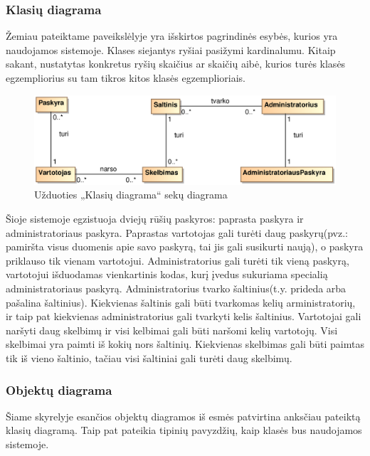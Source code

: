 \documentclass[12pt]{article}
\begin{document}
	\subsubsection{Klasių diagrama}
	
	Žemiau pateiktame paveikslėlyje yra išskirtos pagrindinės esybės, kurios yra naudojamos sistemoje. Klases siejantys ryšiai pasižymi kardinalumu. Kitaip sakant, nustatytas konkretus ryšių skaičius ar skaičių aibė, kurios turės klasės egzempliorius su tam tikros kitos klasės egzemplioriais.
	
	\begin{figure}[h]
		\begin{center}
			\includegraphics[width=\textwidth]{KlasiuDiagrama.eps}
			\caption{Užduoties „Klasių diagrama“ sekų diagrama\label{ClassDiagram}}
		\end{center}
	\end{figure}
	
	Šioje sistemoje egzistuoja dviejų rūšių paskyros: paprasta paskyra ir administratoriaus paskyra. Paprastas vartotojas gali turėti daug paskyrų(pvz.: pamiršta visus duomenis apie savo paskyrą, tai jis gali susikurti naują), o paskyra priklauso tik vienam vartotojui. Administratorius gali turėti tik vieną paskyrą, vartotojui išduodamas vienkartinis kodas, kurį įvedus sukuriama specialią administratoriaus paskyrą. Administratorius tvarko šaltinius(t.y. prideda arba pašalina šaltinius). Kiekvienas šaltinis gali būti tvarkomas kelių arministratorių, ir taip pat kiekvienas administratorius gali tvarkyti kelis šaltinius. Vartotojai gali naršyti daug skelbimų ir visi kelbimai gali būti naršomi kelių vartotojų. Visi skelbimai yra paimti iš kokių nors šaltinių. Kiekvienas skelbimas gali būti paimtas tik iš vieno šaltinio, tačiau visi šaltiniai gali turėti daug skelbimų.
	\pagebreak
	
	\subsubsection{Objektų diagrama}
	
	Šiame skyrelyje esančios objektų diagramos iš esmės patvirtina anksčiau pateiktą klasių diagramą. Taip pat pateikia tipinių pavyzdžių, kaip klasės bus naudojamos sistemoje.
	
\end{document}
